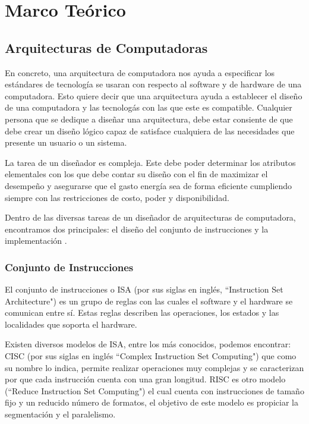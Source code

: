 \chapter{Marco Te\'{o}rico}
\label{ch:marco}
\section{Arquitecturas de Computadoras}

En concreto, una arquitectura de computadora nos ayuda a especificar los est\'{a}ndares de tecnolog\'{i}a se usaran con respecto al software y de hardware de una computadora. Esto quiere decir que una arquitectura ayuda a establecer el dise\~no de una computadora y las tecnolog\'{a}s con las que este es compatible. Cualquier persona que se dedique a dise\~nar una arquitectura, debe estar consiente de que debe crear un dise\~no l\'{o}gico capaz de satisface cualquiera de las necesidades que presente un usuario o un sistema.

La tarea de un dise\~nador es compleja. Este debe poder determinar los atributos elementales con los que debe contar su dise\~no con el fin de maximizar el desempe\~no y asegurarse que el gasto energ\'{i}a sea de forma eficiente cumpliendo siempre con las restricciones de costo, poder y disponibilidad.

Dentro de las diversas tareas de un dise\~nador de arquitecturas de computadora, encontramos dos principales: el dise\~no del conjunto de instrucciones y la implementaci\'{o}n \cite{hennessy2011computer}. 

\subsection{Conjunto de Instrucciones}

El conjunto de instrucciones o ISA (por sus siglas en ingl\'{e}s, “Instruction Set Architecture") es un grupo de reglas con las cuales el software y el hardware se comunican entre s\'{i}. Estas reglas describen las operaciones, los estados y las localidades que soporta el hardware.

Existen diversos modelos de ISA, entre los m\'{a}s conocidos, podemos encontrar: CISC (por sus siglas en ingl\'{e}s “Complex Instruction Set Computing") que como su nombre lo indica, permite realizar operaciones muy complejas y se caracterizan por que cada instrucci\'{o}n cuenta con una gran longitud. RISC es otro modelo (“Reduce Instruction Set Computing") el cual cuenta con instrucciones de tama\~no fijo y un reducido n\'{u}mero de formatos, el objetivo de este modelo es propiciar la segmentaci\'{o}n y el paralelismo.


